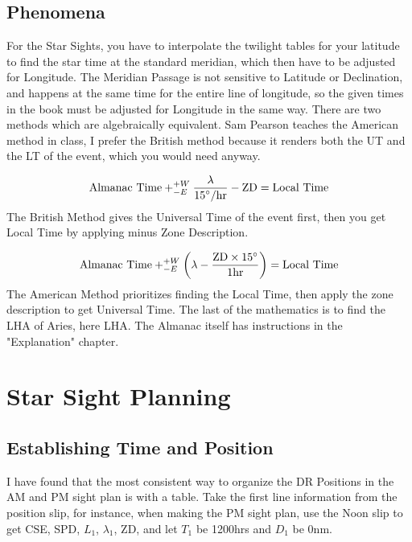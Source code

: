 \documentclass{article}
\begin{document}
\subsection{Phenomena}
For the Star Sights, you have to interpolate the twilight tables for your latitude to find the star time at the standard meridian, which then have to be adjusted for Longitude. The Meridian Passage is not sensitive to Latitude or Declination, and happens at the same time for the entire line of longitude, so the given times in the book must be adjusted for Longitude in the same way. There are two methods which are algebraically equivalent. Sam Pearson teaches the American method in class, I prefer the British method because it renders both the UT and the LT of the event, which you would need anyway.

\[\text{Almanac Time}+^{+W}_{-E}\frac{\lambda}{{15}\degree/\text{hr}}-\text{ZD}=\text{Local Time}\] 
The British Method gives the Universal Time of the event first, then you get Local Time by applying minus Zone Description.

\[\text{Almanac Time}+^{+W}_{-E}\left(\lambda-\frac{\text{ZD}\times15\degree}{1 \text{hr}}\right)=\text{Local Time}\] 
The American Method prioritizes finding the Local Time, then apply the zone description to get Universal Time.
The last of the mathematics is to find the LHA of Aries, here LHA\aries. The Almanac itself has instructions in the "Explanation" chapter.

\section{Star Sight Planning}
\subsection{Establishing Time and Position}
I have found that the most consistent way to organize the DR Positions in the AM and PM sight plan is with a table. Take the first line information from the position slip, for instance, when making the PM sight plan, use the Noon slip to get CSE, SPD, $L_1$, $\lambda_1$, ZD, and let $T_1$ be 1200hrs and $D_1$ be 0nm. 
\end{document}

